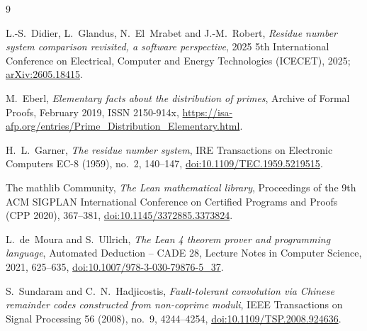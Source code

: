\documentclass[11pt]{amsart}
\theoremstyle{definition}
\begin{document}
\begin{thebibliography}{9}

L.-S.~Didier, L.~Glandus, N.~El~Mrabet and J.-M.~Robert,
\emph{Residue number system comparison revisited, a software perspective},
2025 5th International Conference on Electrical, Computer and Energy Technologies (ICECET),
2025; \href{https://arxiv.org/abs/2605.18415}{arXiv:2605.18415}.

M.~Eberl,
\emph{Elementary facts about the distribution of primes},
Archive of Formal Proofs, February 2019, ISSN 2150-914x,
\url{https://isa-afp.org/entries/Prime_Distribution_Elementary.html}.

H.~L.~Garner,
\emph{The residue number system},
IRE Transactions on Electronic Computers EC-8 (1959), no.~2, 140--147,
\href{https://doi.org/10.1109/TEC.1959.5219515}{doi:10.1109/TEC.1959.5219515}.

The mathlib Community,
\emph{The Lean mathematical library},
Proceedings of the 9th ACM SIGPLAN International Conference on Certified Programs and Proofs
(CPP 2020), 367--381,
\href{https://doi.org/10.1145/3372885.3373824}{doi:10.1145/3372885.3373824}.

L.~de~Moura and S.~Ullrich,
\emph{The Lean 4 theorem prover and programming language},
Automated Deduction -- CADE 28, Lecture Notes in Computer Science, 2021, 625--635,
\href{https://doi.org/10.1007/978-3-030-79876-5_37}{doi:10.1007/978-3-030-79876-5\_37}.

S.~Sundaram and C.~N.~Hadjicostis,
\emph{Fault-tolerant convolution via Chinese remainder codes constructed from non-coprime
moduli},
IEEE Transactions on Signal Processing 56 (2008), no.~9, 4244--4254,
\href{https://doi.org/10.1109/TSP.2008.924636}{doi:10.1109/TSP.2008.924636}.

\end{thebibliography}
\end{document}
